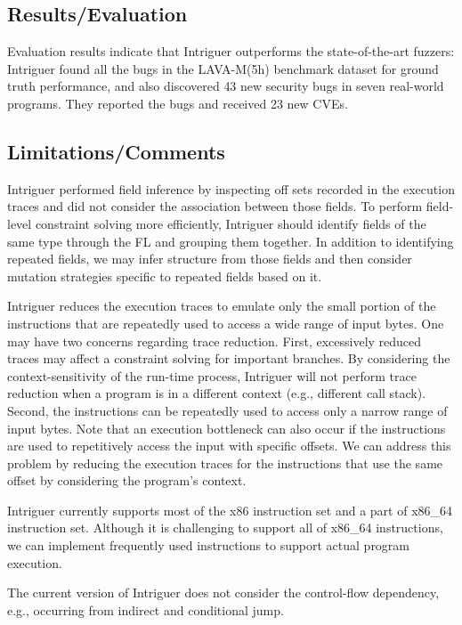 \subsection{Results/Evaluation}
Evaluation results indicate that Intriguer outperforms the state-of-the-art fuzzers: Intriguer found all the bugs in the LAVA-M(5h) benchmark dataset for ground truth performance, and also discovered 43 new security bugs in seven real-world programs. They reported the bugs and received 23 new CVEs.

\subsection{Limitations/Comments}
 Intriguer performed field inference by inspecting off sets recorded in the execution traces and did not consider the association between those fields.  To perform field-level constraint solving more efficiently, Intriguer should identify fields of the same type through the FL and grouping them together. In addition to identifying repeated fields, we may infer structure from those fields and then consider mutation strategies specific to repeated fields based on it.

Intriguer reduces the execution traces to emulate only the small portion of the instructions that are repeatedly used to access a wide range of input bytes. One may have two concerns regarding trace reduction. First, excessively reduced traces may affect a constraint solving for important branches. By considering the context-sensitivity of the run-time process, Intriguer will not perform trace reduction when a program is in a different context (e.g., different call stack). Second, the instructions can be repeatedly used to access only a narrow range of input bytes. Note that an execution bottleneck can also occur if the instructions are used to repetitively access the input with specific offsets. We can address this problem by reducing the execution traces for the instructions that use the same offset by considering the program’s context.

Intriguer currently supports most of the x86 instruction set and a part of x86\_64 instruction set. Although it is challenging to support all of x86\_64 instructions, we can implement frequently used instructions to support actual program execution.

The current version of Intriguer does not consider the control-flow dependency, e.g., occurring from indirect
and conditional jump.
\newpage

